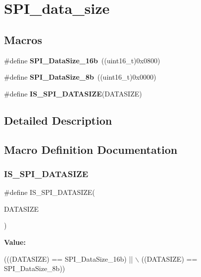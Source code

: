 \section{S\+P\+I\+\_\+data\+\_\+size}
\label{group__SPI__data__size}
\subsection*{Macros}
\begin{DoxyCompactItemize}
\item 
\#define \textbf{ S\+P\+I\+\_\+\+Data\+Size\+\_\+16b}~((uint16\+\_\+t)0x0800)
\item 
\#define \textbf{ S\+P\+I\+\_\+\+Data\+Size\+\_\+8b}~((uint16\+\_\+t)0x0000)
\item 
\#define \textbf{ I\+S\+\_\+\+S\+P\+I\+\_\+\+D\+A\+T\+A\+S\+I\+ZE}(D\+A\+T\+A\+S\+I\+ZE)
\end{DoxyCompactItemize}


\subsection{Detailed Description}


\subsection{Macro Definition Documentation}
\mbox{\label{group__SPI__data__size_gab6f9f528f7eb70373b9caf3548e44e67}} 
\subsubsection{I\+S\+\_\+\+S\+P\+I\+\_\+\+D\+A\+T\+A\+S\+I\+ZE}
{\footnotesize\ttfamily \#define I\+S\+\_\+\+S\+P\+I\+\_\+\+D\+A\+T\+A\+S\+I\+ZE(\begin{DoxyParamCaption}\item[{}]{D\+A\+T\+A\+S\+I\+ZE }\end{DoxyParamCaption})}

{\bfseries Value\+:}
\begin{DoxyCode}
(((DATASIZE) == SPI_DataSize_16b) || \(\backslash\)
                                   ((DATASIZE) == SPI_DataSize_8b))
\end{DoxyCode}


